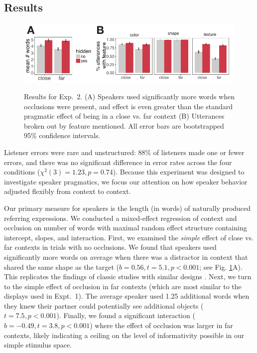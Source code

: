 \documentclass[manuscript]{stjour}
\begin{document}
\subsection{Results}

 \begin{figure}[t!]
 \begin{center}
 \vspace{-.25cm}
 \includegraphics[scale=1.25]{figures/Exp2_results.pdf}
 \vspace{-.5cm}
 \caption{Results for Exp.~2. (A) Speakers used significantly more words when occlusions were present, and effect is even greater than the standard pragmatic effect of being in a close vs. far context (B) Utterances broken out by feature mentioned. All error bars are bootstrapped 95\% confidence intervals.}
 \vspace{-.5cm}
 \label{fig:exp2results}
 \end{center}
 \end{figure}

Listener errors were rare and unstructured: 88\% of listeners made one or fewer errors, and there was no significant difference in error rates across the four conditions ($\chi^2(3) = 1.23, p = 0.74$). Because this experiment was designed to investigate speaker pragmatics, we focus our attention on how speaker behavior adjusted flexibly from context to context.

Our primary measure for speakers is the length (in words) of naturally produced referring expressions. We conducted a mixed-effect regression of context and occlusion on number of words with maximal random effect structure containing intercept, slopes, and interaction. First, we examined the \emph{simple} effect of close vs. far contexts in trials with no occlusions. We found that speakers used significantly more words on average when there was a distractor in context that shared the same shape as the target ($b = 0.56, t = 5.1, p < 0.001$; see Fig. \ref{fig:exp2results}A). This replicates the findings of classic studies with similar designs \cite[e.g] {BrennanClark96_ConceptualPactsConversation, GrafEtAl16_BasicLevel, MonroeEtAl17_ColorsInContext}. Next, we turn to the simple effect of occlusion in far contexts (which are most similar to the displays used in Expt.~1). The average speaker used 1.25 additional words when they knew their partner could potentially see additional objects ($t = 7.5, p < 0.001$). Finally, we found a significant interaction ($b = -0.49, t = 3.8, p <0.001$) where the effect of occlusion was larger in far contexts, likely indicating a ceiling on the level of informativity possible in our simple stimulus space.
\end{document}
